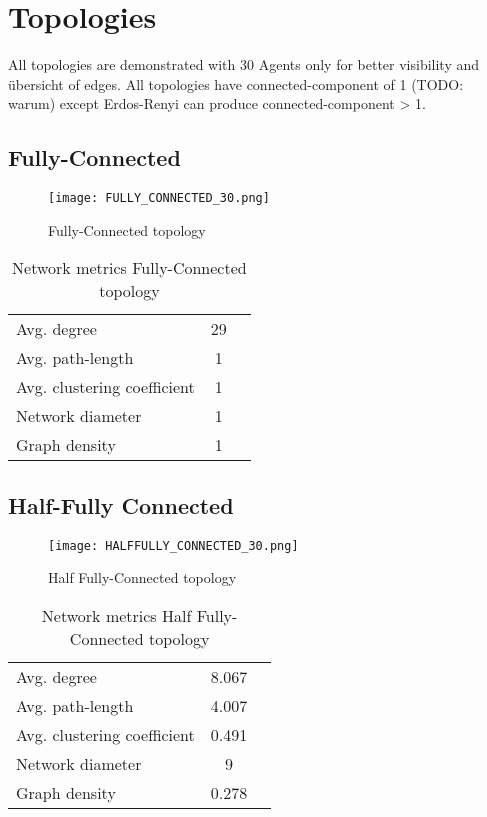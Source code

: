 \documentclass[Bachelorarbeit.tex]{subfiles}
\begin{document}
\graphicspath{{./figures/appendixTopologies/}}	%

\chapter{Topologies}
\label{app:topologies}

All topologies are demonstrated with 30 Agents only for better visibility and übersicht of edges. 
All topologies have connected-component of 1 (TODO: warum) except Erdos-Renyi can produce connected-component > 1.

\section{Fully-Connected}

\begin{figure}[H]
	\centering
  \texttt{[image: FULLY\_CONNECTED\_30.png]}
	\caption{Fully-Connected topology}
	\label{fig:topology_FULLY_CONNECTED_30}
\end{figure}

\begin{table}[h]
	\centering
	\caption{Network metrics Fully-Connected topology}
	\begin{tabular} { l c r }
		\hline
		Avg. degree & 29 \\
		Avg. path-length & 1 \\
		Avg. clustering coefficient & 1 \\
		Network diameter & 1 \\
		Graph density & 1 \\
		\hline
	\end{tabular}
\end{table}

\section{Half-Fully Connected}
\begin{figure}[H]
	\centering
  \texttt{[image: HALFFULLY\_CONNECTED\_30.png]}
	\caption{Half Fully-Connected topology}
	\label{fig:topology_HALFFULLY_CONNECTED_30}
\end{figure}

\begin{table}[h]
	\centering
	\caption{Network metrics Half Fully-Connected topology}
	\begin{tabular} { l c r }
		\hline
		Avg. degree & 8.067 \\
		Avg. path-length & 4.007 \\
		Avg. clustering coefficient & 0.491 \\
		Network diameter & 9 \\
		Graph density & 0.278 \\
		\hline
	\end{tabular}
\end{table}
\end{document}
